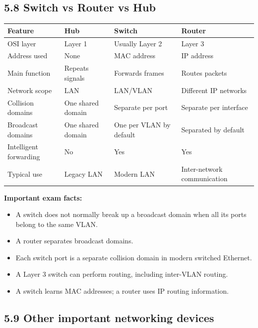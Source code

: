 \subsection{5.8 Switch vs Router vs Hub}

\begin{table}[htbp]
\centering
\begin{tabularx}{\textwidth}{p{3.0cm} p{3.2cm} X X}
\toprule
\textbf{Feature} & \textbf{Hub} & \textbf{Switch} & \textbf{Router} \\
\midrule
OSI layer & Layer 1 & Usually Layer 2 & Layer 3 \\
Address used & None & MAC address & IP address \\
Main function & Repeats signals & Forwards frames & Routes packets \\
Network scope & LAN & LAN/VLAN & Different IP networks \\
Collision domains & One shared domain & Separate per port & Separate per interface \\
Broadcast domains & One shared domain & One per VLAN by default & Separated by default \\
Intelligent forwarding & No & Yes & Yes \\
Typical use & Legacy LAN & Modern LAN & Inter-network communication \\
\bottomrule
\end{tabularx}
\end{table}

\textbf{Important exam facts:}

\begin{itemize}
    \item A switch does not normally break up a broadcast domain when all its ports belong to the same VLAN.
    \item A router separates broadcast domains.
    \item Each switch port is a separate collision domain in modern switched Ethernet.
    \item A Layer 3 switch can perform routing, including inter-VLAN routing.
    \item A switch learns MAC addresses; a router uses IP routing information.
\end{itemize}

\subsection{5.9 Other important networking devices}

